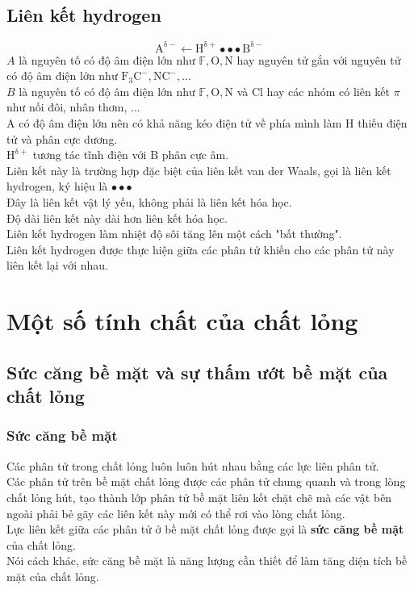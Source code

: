\subsection{Liên kết hydrogen}
$$\mathrm{{A^{\delta  - }} \leftarrow {H^{\delta  + }} \bullet  \bullet  \bullet {B^{\delta  - }}}$$
$A$ là nguyên tố có độ âm điện lớn như $\mathbb{F}, \mathrm{O}, \mathrm{N}$ hay nguyên tử gắn với nguyên tử có độ âm điện lớn như $\mathrm{F_3C ^-}, \mathrm{NC^-}, ...$\\
$B$ là nguyên tố có độ âm điện lớn như $\mathbb{F}, \mathrm{O}, \mathrm{N}$ và $\mathrm{Cl}$ hay các nhóm có liên kết $\pi$ như nối đôi, nhân thơm, ...\\
$\mathrm{A}$ có độ âm điện lớn nên có khả năng kéo điện tử về phía mình làm $\mathrm{H}$ thiếu điện tử và phân cực dương.\\
$\mathrm{H^{\delta  + }}$ tương tác tĩnh điện với $\mathrm{B}$ phân cực âm.\\
Liên kết này là trường hợp đặc biệt của liên kết van der Waals, gọi là liên kết hydrogen, ký hiệu là $\bullet  \bullet  \bullet$\\
Đây là liên kết vật lý yếu, không phải là liên kết hóa học.\\
Độ dài liên kết này dài hơn liên kết hóa học.\\
Liên kết hydrogen làm nhiệt độ sôi tăng lên một cách "bất thường".\\
Liên kết hydrogen được thực hiện giữa các phân tử khiến cho các phân tử này liên kết lại với nhau.
\section{Một số tính chất của chất lỏng}
\subsection{Sức căng bề mặt và sự thấm ướt bề mặt của chất lỏng}
\subsubsection{Sức căng bề mặt}
Các phân tử trong chất lỏng luôn luôn hút nhau bằng các lực liên phân tử.\\
Các phân tử trên bề mặt chất lỏng được các phân tử chung quanh và trong lòng chất lỏng hút, tạo thành lớp phân tử bề mặt liên kết chặt chẽ mà các vật bên ngoài phải bẻ gãy các liên kết này mới có thể rơi vào lòng chất lỏng.\\
Lực liên kết giữa các phân tử ở bề mặt chất lỏng được gọi là \textbf{sức căng bề mặt} của chất lỏng.\\
Nói cách khác, sức căng bề mặt là năng lượng cần thiết để làm tăng diện tích bề mặt của chất lỏng.
